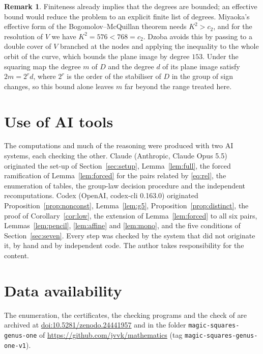 \documentclass[11pt]{amsart}
\theoremstyle{definition}
\newtheorem{remark}[theorem]{Remark}
\begin{document}
\begin{remark}
Finiteness already implies that the degrees are bounded; an effective bound would reduce the problem to an explicit
finite list of degrees. Miyaoka's effective form of the
Bogomolov--McQuillan theorem \cite{Mi} needs $K^2>c_2$, and for the resolution of $V$ we have $K^2=576<768=c_2$. Dzoba
\cite[\S23]{Dz} avoids this by passing to a double cover of $V$ branched at the nodes and applying the inequality to the
whole orbit of the curve, which bounds the plane image by degree $153$. Under the squaring map the degree $m$ of $D$
and the degree $d$ of its plane image satisfy $2m=2^rd$, where $2^r$ is the order of the stabiliser of $D$ in the group of
sign changes, so this bound alone leaves $m$ far beyond the range treated here.
\end{remark}

\section*{Use of AI tools}
The computations and much of the reasoning were produced with two AI systems, each checking the other. Claude
(Anthropic, Claude Opus 5.5) originated the set-up of Section~\ref{sec:setup}, Lemma~\ref{lem:full}, the forced
ramification of Lemma~\ref{lem:forced} for the pairs related by \eqref{eq:rel}, the enumeration of tables, the
group-law decision procedure and the independent recomputations. Codex (OpenAI, codex-cli 0.163.0) originated
Proposition~\ref{prop:nonconst}, Lemma~\ref{lem:g5}, Proposition~\ref{prop:distinct}, the proof of
Corollary~\ref{cor:low}, the extension of Lemma~\ref{lem:forced} to all six pairs, Lemmas~\ref{lem:pencil},
\ref{lem:affine} and \ref{lem:mono}, and the five conditions of Section~\ref{sec:seven}. Every step was checked by
the system that did not originate it, by hand and by independent code. The author takes responsibility for the
content.

\section*{Data availability}
The enumeration, the certificates, the checking programs and the check of \cite[Thm.~6.4]{Dz} are archived at
\href{https://doi.org/10.5281/zenodo.24441957}{doi:10.5281/zenodo.24441957} and in the folder
\texttt{magic-squares-genus-one} of \url{https://github.com/jvvk/mathematics} (tag \texttt{magic-squares-genus-one-v1}).
\end{document}
